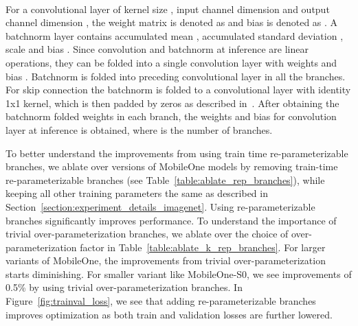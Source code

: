 \begin{table}
    \centering
    \small
        \vspace{-0.2cm}
      ~\label{table:ablate_k_rep_branches}
      \vspace{-0.2cm}
\end{table}

For a convolutional layer of kernel size , input channel dimension  and output channel dimension , the weight matrix is denoted as  and bias is denoted as . A batchnorm layer contains accumulated mean , accumulated standard deviation , scale  and bias . Since convolution and batchnorm at inference are linear operations, they can be folded into a single convolution layer with weights  and bias . Batchnorm is folded into preceding convolutional layer in all the branches. For skip connection the batchnorm is folded to a convolutional layer with identity 1x1 kernel, which is then padded by  zeros as described in~\cite{Ding_2021_repvgg}. After obtaining the batchnorm folded weights in each branch, the weights  and bias  for convolution layer at inference is obtained, where  is the number of branches.  

To better understand the improvements from using train time re-parameterizable branches, we ablate over versions of MobileOne models by removing train-time re-parameterizable branches (see Table~\ref{table:ablate_rep_branches}), while keeping all other training parameters the same as described in Section~\ref{section:experiment_details_imagenet}. Using re-parameterizable branches significantly improves performance. To understand the importance of trivial over-parameterization branches, we ablate over the choice of over-parameterization factor  in Table~\ref{table:ablate_k_rep_branches}. For larger variants of MobileOne, the improvements from trivial over-parameterization starts diminishing. For smaller variant like MobileOne-S0, we see improvements of 0.5\% by using trivial over-parameterization branches. In Figure~\ref{fig:trainval_loss}, we see that adding re-parameterizable branches improves optimization as both train and validation losses are further lowered. 

